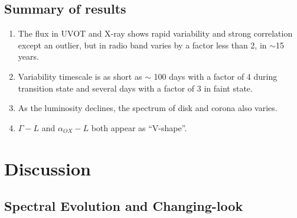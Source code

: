 \documentclass[twocolumn]{aastex63}
\begin{document}
\subsection{Summary of results}
\begin{enumerate}
\item The flux in UVOT and X-ray shows rapid variability and strong correlation except an outlier, but in radio band varies by a factor less than 2, in $\sim$15 years. 

\item Variability timescale is as short as $\sim$ 100 days with a factor of 4 during transition state and several days with a factor of 3 in faint state.

\item As the luminosity declines, the spectrum of disk and corona also varies.

\item $\Gamma-L$ and $\alpha_{OX}-L$ both appear as ``V-shape''. 


\end{enumerate}






\section{Discussion}\label{sec:discussion}
\subsection{Spectral Evolution and Changing-look}
\end{document}
